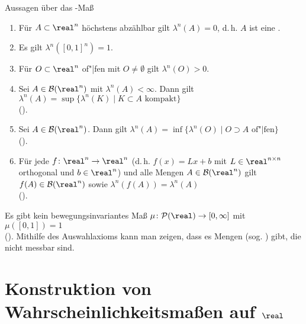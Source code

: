 \begin{Satz}{Aussagen über das -Maß}
    \begin{enumerate}
        \item
        Für $A \subset \real^n$ höchstens abzählbar gilt $\lambda^n(A) = 0$,
        d.\,h. $A$ ist eine .

        \item
        Es gilt $\lambda^n([0, 1]^n) = 1$.

        \item
        Für $O \subset \real^n$ of"|fen mit $O \not= \emptyset$ gilt $\lambda^n(O) > 0$.

        \item
        Sei $A \in \B(\real^n)$ mit $\lambda^n(A) < \infty$.
        Dann gilt $\lambda^n(A) = \sup\{\lambda^n(K) \;|\; K \subset A \text{ kompakt}\}$\\
        ().

        \item
        Sei $A \in \B(\real^n)$.
        Dann gilt $\lambda^n(A) = \inf\{\lambda^n(O) \;|\; O \supset A \text{ of"|fen}\}$\\
        ().

        \item
        Für jede  $f\colon \real^n \rightarrow \real^n$
        (d.\,h. $f(x) = Lx + b$ mit $L \in \real^{n \times n}$ orthogonal und $b \in \real^n$)
        und alle Mengen $A \in \B(\real^n)$ gilt
        $f(A) \in \B(\real^n)$ sowie $\lambda^n(f(A)) = \lambda^n(A)$\\
        ().
    \end{enumerate}
\end{Satz}

\begin{Bem}
    Es gibt kein bewegungsinvariantes Maß $\mu\colon \P(\real) \rightarrow [0, \infty]$ mit
    $\mu([0, 1]) = 1$\\
    ().
    Mithilfe des Auswahlaxioms kann man zeigen, dass es Mengen
    (sog. ) gibt, die nicht messbar sind.
\end{Bem}

\pagebreak

\section{%
    Konstruktion von Wahrscheinlichkeitsmaßen auf \texorpdfstring{$\real$}{ℝ}%
}

